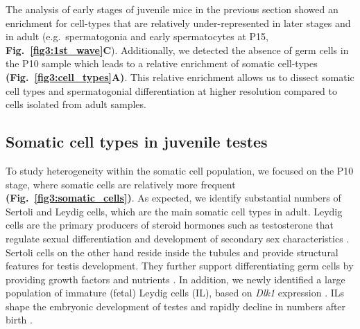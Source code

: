 The analysis of early stages of juvenile mice in the previous section showed an enrichment for cell-types that are relatively under-represented in later stages and in adult (e.g.~spermatogonia and early spermatocytes at P15, \textbf{Fig.~\ref{fig3:1st_wave}C}). Additionally, we detected the absence of germ cells in the P10 sample which leads to a relative enrichment of somatic cell-types \textbf{(Fig.~\ref{fig3:cell_types}A)}. This relative enrichment allows us to dissect somatic cell types and spermatogonial differentiation at higher resolution compared to cells isolated from adult samples.

\subsection{Somatic cell types in juvenile testes}

To study heterogeneity within the somatic cell population, we focused on the P10 stage, where somatic cells are relatively more frequent \textbf{(Fig.~\ref{fig3:somatic_cells})}. As expected, we identify substantial numbers of Sertoli and Leydig cells, which are the main somatic cell types in adult. Leydig cells are the primary producers of steroid hormones such as testosterone that regulate sexual differentiation and development of secondary sex characteristics \citep{Svechnikov2010, Haider2004}. Sertoli cells on the other hand reside inside the tubules and provide structural features for testis development. They further support differentiating germ cells by providing growth factors and nutrients  \citep{Griswold1998}. In addition, we newly identified a large population of immature (fetal) Leydig cells (IL), based on \textit{Dlk1} expression \citep{Lottrup2014}. ILs shape the embryonic development of testes and rapidly decline in numbers after birth \citep{Griswold2009}. \\


